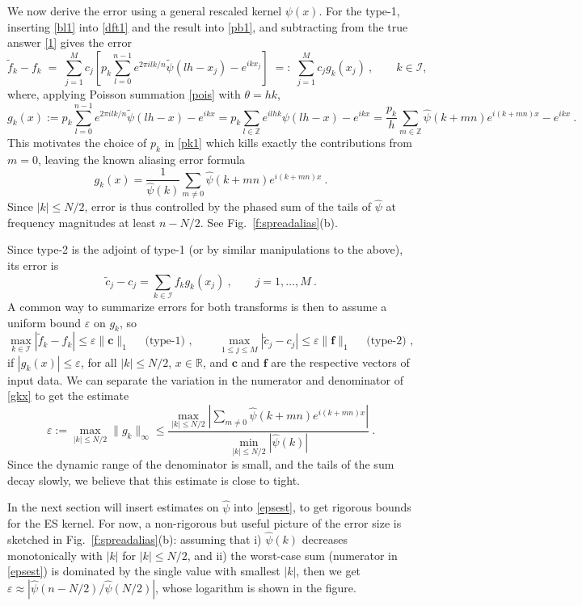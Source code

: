 \documentclass[10pt]{article}
\newcommand{\be}{\begin{equation}}
\newcommand{\ee}{\end{equation}}
\newcommand{\mbf}[1]{{\mathbf #1}}
\newcommand{\RR}{\mathbb{R}}
\newcommand{\ZZ}{\mathbb{Z}}
\newcommand{\eps}{\varepsilon}
\newcommand{\KK}{{\mathcal I}}     %
\newcommand{\ppsi}{{\tilde\psi}}   %
\begin{document}
We now derive the error using a general rescaled kernel $\psi(x)$.
For the type-1, inserting \eqref{bl1} into \eqref{dft1}
and the result into \eqref{pb1}, and subtracting from the true answer
\eqref{1} gives the error
$$
\tilde f_k - f_k  \;=\;
\sum_{j=1}^M c_j \left[ p_k \sum_{l=0}^{n-1} e^{2\pi i l k/n}
  \ppsi(lh-x_j) - e^{ikx_j} \right ]
\;=:\; \sum_{j=1}^M c_j g_k(x_j)
~, \qquad k\in\KK,
$$
where, applying Poisson summation \eqref{pois} with $\theta=hk$,
$$
g_k(x) :=  p_k \sum_{l=0}^{n-1} e^{2\pi i l k/n}
\ppsi(lh-x) - e^{ikx}
= p_k \sum_{l\in\ZZ} e^{ilhk} \psi(lh-x) - e^{ikx}
=
\frac{p_k}{h} \sum_{m\in\ZZ} \hat\psi(k+mn) e^{i(k+mn)x} - e^{ikx}
~.
$$
This motivates the choice of $p_k$ in \eqref{pk1} which
kills exactly the contributions from
$m=0$, leaving the known aliasing error formula \cite[(1.16)]{nfftchap}
\cite[(4.1)]{fourmont} \cite[Sec.~V.B]{fessler}
\be
g_k(x) = \frac{1}{\hat\psi(k)}\sum_{m\neq 0} \hat\psi(k+mn) e^{i(k+mn)x}
~.
\label{gkx}
\ee
Since $|k|\le N/2$,
error is thus controlled by the phased sum of the tails of $\hat\psi$
at frequency magnitudes at least $n-N/2$. See Fig.~\ref{f:spreadalias}(b).

Since type-2 is the adjoint of type-1 (or by similar manipulations to the
above), its error is
\be
\tilde c_j - c_j = \sum_{k\in\KK} f_k g_k(x_j)
~, \qquad j=1,\dots,M~.
\ee
A common way to summarize errors for both transforms is then
to assume a uniform bound $\eps$ on $g_k$, so
\be
\max_{k\in\KK}|\tilde f_k - f_k| \le \eps \|\mbf{c}\|_1
\quad \mbox{ (type-1)~, } \qquad
\max_{1\le j\le M}|\tilde c_j - c_j| \le \eps \|\mbf{f}\|_1
\quad \mbox{ (type-2)~, }
\label{1nrm}
\ee
if $|g_k(x)| \le \eps$, for all $|k|\le N/2$, $x\in\RR$,
and $\mbf{c}$ and $\mbf{f}$ are the respective vectors of input data.
We can separate the variation in the numerator and denominator
of \eqref{gkx} to get the estimate
\be
\eps := \max_{|k|\le N/2}
\|g_k\|_\infty \le
\frac{
  \max_{|k|\le N/2} \left|
    \sum_{m\neq 0} \hat\psi(k+mn) e^{i(k+mn)x}
  \right|
}{\min_{|k|\le N/2} |\hat\psi(k)|}
~.
\label{epsest}
\ee
Since the dynamic range of the denominator is small, and the tails
of the sum decay slowly, we believe that this estimate is close to tight.

In the next section will insert estimates on $\hat\psi$ into
\eqref{epsest}, to get rigorous bounds for the ES kernel.
For now, a non-rigorous but useful picture of the error size
is sketched in Fig.~\ref{f:spreadalias}(b):
assuming that i) $\hat\psi(k)$ decreases monotonically
with $|k|$ for $|k|\le N/2$, and  ii) the worst-case sum (numerator in \eqref{epsest}) is dominated by the single value with smallest $|k|$,
then we get $ \eps \approx |\hat\psi(n-N/2) / \hat\psi(N/2) |$,
whose logarithm is shown in the figure.
\end{document}

